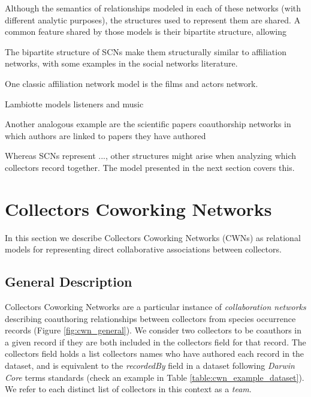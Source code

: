 
Although the semantics of relationships modeled in each of these networks (with different analytic purposes), the structures used to represent them are shared. A common feature shared by those models is their bipartite structure, allowing  

The bipartite structure of SCNs make them structurally similar to affiliation networks, with some examples in the social networks literature.

One classic affiliation network model is the films and actors network.

Lambiotte models listeners and music

Another analogous example are the scientific papers coauthorship networks in which authors are linked to papers they have authored \cite{Newman2004}



Whereas SCNs represent ..., other structures might arise when analyzing which collectors record together. 
The model presented in the next section covers this.











\section{Collectors Coworking Networks}
In this section we describe Collectors Coworking Networks (CWNs) as relational models for representing direct collaborative associations between collectors.

\subsection{General Description}
Collectors Coworking Networks are a particular instance of \textit{collaboration networks} \cite{Ramasco2004} describing coauthoring relationships between collectors from species occurrence records (Figure \ref{fig:cwn_general}).
We consider two collectors to be coauthors in a given record if they are both included in the collectors field for that record. The collectors field holds a list collectors names who have authored each record in the dataset, and is equivalent to the \textit{recordedBy} field in a dataset following \textit{Darwin Core} terms standards (check an example in Table \ref{table:cwn_example_dataset}). We refer to each distinct list of collectors in this context as a \textit{team}.


